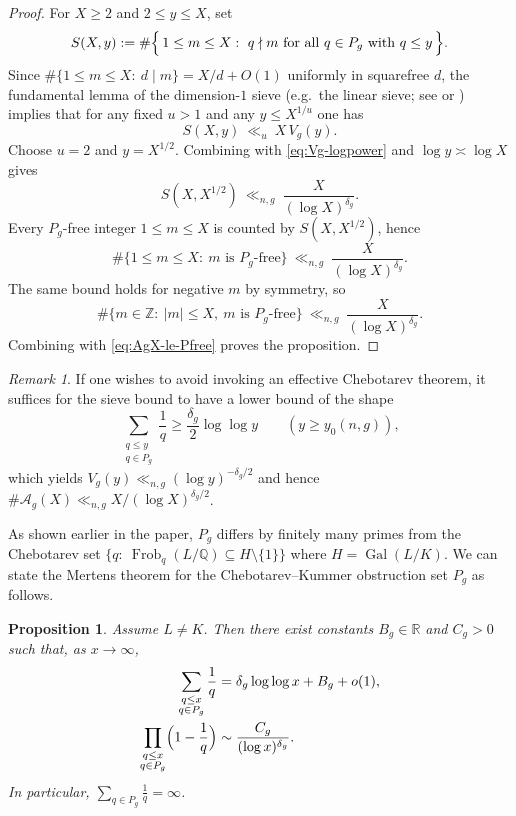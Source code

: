 \documentclass[11pt,letterpaper]{amsart}
\newcommand{\Z}{\mathbb{Z}}
\newcommand{\Q}{\mathbb{Q}}
\newcommand{\R}{\mathbb{R}}
\newcommand{\Gal}{\operatorname{Gal}}
\newcommand{\Frob}{\operatorname{Frob}}
\theoremstyle{plain}
\newtheorem{proposition}[theorem]{Proposition}
\theoremstyle{definition}
\theoremstyle{remark}
\newtheorem{remark}[theorem]{Remark}
\theoremstyle{plain}
\begin{document}
\begin{proof}
For $X\ge 2$ and $2\le y\le X$, set
\[
S(X,y):=\#\Bigl\{\,1\le m\le X:\ q\nmid m\ \text{for all }q\in P_g\text{ with }q\le y\,\Bigr\}.
\]
Since $\#\{1\le m\le X:\ d\mid m\}=X/d+O(1)$ uniformly in squarefree $d$, the fundamental lemma of the
dimension-$1$ sieve (e.g.\ the linear sieve; see \cite[\S6.4]{IK04} or \cite[Ch.~5]{HR74}) implies that for any fixed $u>1$
and any $y\le X^{1/u}$ one has
\[
S(X,y)\ \ll_{u}\ X\,V_g(y).
\]
Choose $u=2$ and $y=X^{1/2}$. Combining with \eqref{eq:Vg-logpower} and $\log y\asymp\log X$ gives
\[
S(X,X^{1/2})\ \ll_{n,g}\ \frac{X}{(\log X)^{\delta_g}}.
\]
Every $P_g$-free integer $1\le m\le X$ is counted by $S(X,X^{1/2})$, hence
\[
\#\{1\le m\le X:\ \text{$m$ is $P_g$-free}\}\ \ll_{n,g}\ \frac{X}{(\log X)^{\delta_g}}.
\]
The same bound holds for negative $m$ by symmetry, so
\[
\#\{m\in\Z:\ |m|\le X,\ \text{$m$ is $P_g$-free}\}
\ \ll_{n,g}\ \frac{X}{(\log X)^{\delta_g}}.
\]
Combining with \eqref{eq:AgX-le-Pfree} proves the proposition.
\end{proof}

\begin{remark}
If one wishes to avoid invoking an effective Chebotarev theorem, it suffices for the sieve bound
to have a lower bound of the shape
\[
\sum_{\substack{q\le y\\ q\in P_g}}\frac1q \ge \frac{\delta_g}{2}\log\log y
\qquad (y\ge y_0(n,g)),
\]
which yields $V_g(y)\ll_{n,g}(\log y)^{-\delta_g/2}$ and hence
$\#\mathcal A_g(X)\ll_{n,g}X/(\log X)^{\delta_g/2}$.
\end{remark}

As shown earlier in the paper, $P_g$ differs by finitely many primes from the Chebotarev set
$\{q:\ \Frob_q(L/\Q)\subseteq H\setminus\{1\}\}$ where $H=\Gal(L/K)$.
We can state the Mertens theorem for the Chebotarev--Kummer obstruction set $P_g$ as follows.
\begin{proposition}
\label{prop:mertens-Pg-constant}
Assume $L\ne K$.
Then there exist constants $B_g\in\R$ and $C_g>0$ such that, as $x\to\infty$,
\begin{align}
\sum_{\substack{q\le x\\ q\in P_g}}\frac1q
&=\delta_g\log\log x+B_g+o(1),
\label{eq:Pg-mertens-sum}
\\
\prod_{\substack{q\le x\\ q\in P_g}}\Bigl(1-\frac1q\Bigr)
&\sim \frac{C_g}{(\log x)^{\delta_g}}.
\label{eq:Pg-mertens-prod}
\end{align}
In particular, $\sum_{q\in P_g}\frac1q=\infty$.
\end{proposition}
\end{document}
